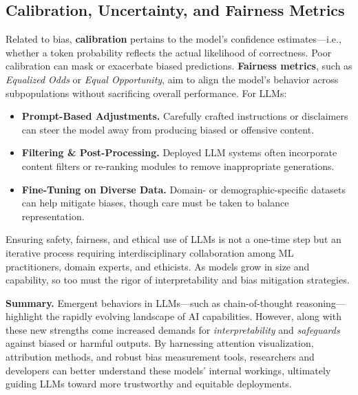 \subsection{Calibration, Uncertainty, and Fairness Metrics}
\noindent
Related to bias, \textbf{calibration} pertains to the model’s confidence estimates—i.e., whether a token probability reflects the actual likelihood of correctness. Poor calibration can mask or exacerbate biased predictions. \textbf{Fairness metrics}, such as \emph{Equalized Odds} or \emph{Equal Opportunity}, aim to align the model’s behavior across subpopulations without sacrificing overall performance. For LLMs:
\begin{itemize}
    \item \textbf{Prompt-Based Adjustments.} Carefully crafted instructions or disclaimers can steer the model away from producing biased or offensive content.
    \item \textbf{Filtering \& Post-Processing.} Deployed LLM systems often incorporate content filters or re-ranking modules to remove inappropriate generations.
    \item \textbf{Fine-Tuning on Diverse Data.} Domain- or demographic-specific datasets can help mitigate biases, though care must be taken to balance representation.
\end{itemize}

\noindent
Ensuring safety, fairness, and ethical use of LLMs is not a one-time step but an iterative process requiring interdisciplinary collaboration among ML practitioners, domain experts, and ethicists. As models grow in size and capability, so too must the rigor of interpretability and bias mitigation strategies.

\bigskip
\noindent
\textbf{Summary.} Emergent behaviors in LLMs—such as chain-of-thought reasoning—highlight the rapidly evolving landscape of AI capabilities. However, along with these new strengths come increased demands for \emph{interpretability} and \emph{safeguards} against biased or harmful outputs. By harnessing attention visualization, attribution methods, and robust bias measurement tools, researchers and developers can better understand these models’ internal workings, ultimately guiding LLMs toward more trustworthy and equitable deployments.
